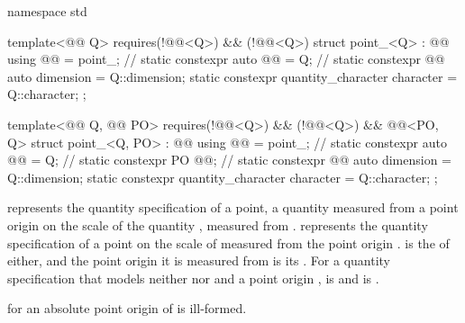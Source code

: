 \begin{codeblock}
namespace std {

template<@@ Q>
  requires(!@@<Q>) && (!@@<Q>)
struct point_<Q> : @@ {
  using @@ = point_;                   // \expos
  static constexpr auto @@ = Q{};  // \expos
  static constexpr @@ auto dimension = Q::dimension;
  static constexpr quantity_character character = Q::character;
};

template<@@ Q, @@ PO>
  requires(!@@<Q>) && (!@@<Q>) &&
          @@<PO, Q{}>
struct point_<Q, PO> : @@ {
  using @@ = point_;                   // \expos
  static constexpr auto @@ = Q{};  // \expos
  static constexpr PO @@{};         // \expos
  static constexpr @@ auto dimension = Q::dimension;
  static constexpr quantity_character character = Q::character;
};

}
\end{codeblock}

\pnum
{} represents the quantity specification of a point,
a quantity measured from a point origin on the scale of the quantity ,
measured from .
 represents the quantity specification of a point on the scale of 
measured from the point origin .
 is the  of either,
and the point origin it is measured from is its .
For a quantity specification  that models neither 
nor  and a point origin ,
 is  and
 is .
\begin{note}
for an absolute point origin  of  is ill-formed.
\end{note}


